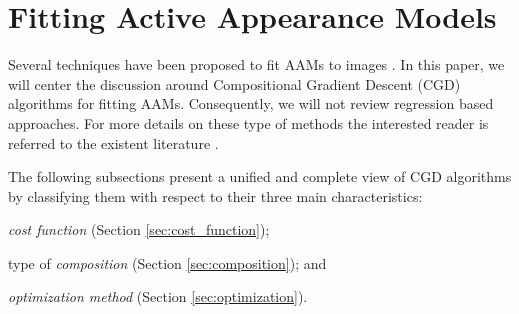 \section{Fitting Active Appearance Models}
\label{sec:fitting}


Several techniques have been proposed to fit AAMs to images \cite{Cootes2001, Hou2001, Matthews2004, Batur2005, Gross2005, Donner2006, Papandreou2008, Liu2009, Saragih2009, Amberg2009, Tresadern2010, Martins2010, Sauer2011, Tzimiropoulos2013, Kossaifi2014, Antonakos2014}. In this paper, we will center the discussion around Compositional Gradient Descent (CGD) algorithms \cite{Matthews2004, Gross2005, Papandreou2008, Amberg2009, Martins2010, Tzimiropoulos2013, Kossaifi2014} for fitting AAMs. Consequently, we will not review regression based approaches. For more details on these type of methods the interested reader is referred to the existent literature \cite{Cootes2001, Hou2001, Batur2005, Donner2006, Liu2009, Saragih2009, Tresadern2010, Sauer2011}.

The following subsections present a unified and complete view of CGD algorithms by classifying them with respect to their three main characteristics: 
\begin{inparaenum}
\item \emph{cost function} (Section \ref{sec:cost_function}); 
\item type of \emph{composition} (Section \ref{sec:composition}); and 
\item \emph{optimization method} (Section \ref{sec:optimization}).
\end{inparaenum}

